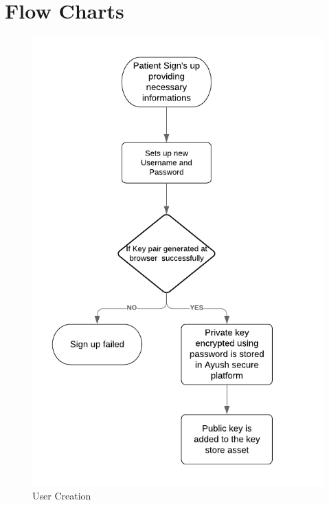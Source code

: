 \documentclass[11pt]{report}
\begin{document}
\newpage
\section{Flow Charts}   
    \begin{figure}[h!]
        \centering
        \includegraphics[scale=0.8]{F3.png}
        \caption{User Creation}
        \label{fig:my_label}
    \end{figure}
    
\end{document}
